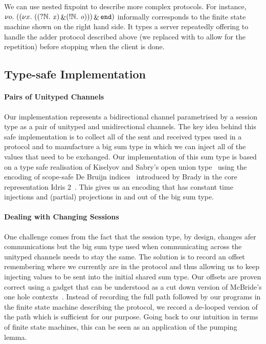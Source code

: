 \documentclass{easychair}
\begin{document}
We can use nested fixpoint to describe more complex
protocols. For instance,
$
\nu o.~(
  (\nu x.~((?\mathbb{N}.~\mathit{x}) \mathop{\&} (!\mathbb{N}.~\mathit{o}))
  ) \mathop{\&} \mathtt{end})
$
informally corresponds to the finite state machine
shown on the right hand side.
It types a server repeatedly offering to handle the adder
protocol described above (we replaced \stopsesh{} with
 to allow for the repetition) before stopping
when the client is done.


\subsection*{Type-safe Implementation}

\paragraph{Pairs of Unityped Channels}
Our implementation represents a bidirectional channel
parametrised by a session type as a pair of unityped
and unidirectional channels.
%
The key idea behind this safe implementation is to collect all of the sent
and received types used in a protocol and to manufacture a big sum type
in which we can inject all of the values that need to be exchanged.
%
Our implementation of this sum type is based on a type safe realisation of
Kiselyov and Sabry's open union type~\cite{DBLP:conf/haskell/KiselyovSS13}
using the encoding of scope-safe
De Bruijn indices~\cite{MANUAL:journals/math/debruijn72}
introduced by Brady in the core representation
Idris 2~\cite{DBLP:conf/ecoop/Brady21}.
%
This gives us an encoding that has constant time injections and
(partial) projections in and out of the big sum type.

\paragraph{Dealing with Changing Sessions}
One challenge comes from the fact that the session type, by design,
changes afer communications but the big sum type used when communicating
across the unityped channels needs to stay the same.
%
The solution is to record an offset remembering where we currently
are in the protocol and thus allowing us to keep injecting values to
be sent into the initial shared sum type.
%
Our offsets are proven correct using a gadget that can be understood
as a cut down version of McBride's one hole
contexts~\cite{DBLP:conf/popl/McBride08}. Instead
of recording the full path followed by our programs in the finite
state machine describing the protocol, we record a de-looped version
of the path which is sufficient for our purpose.
%
Going back to our intuition in terms of finite state machines,
this can be seen as an application of the pumping lemma.
\end{document}
